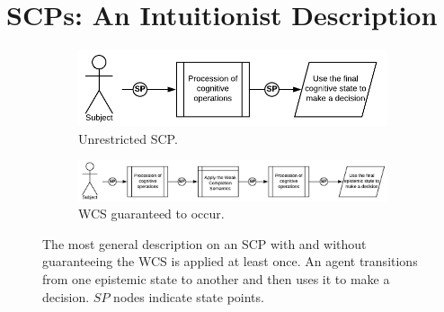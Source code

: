 \documentclass[
11pt, %
english, %
singlespacing, %
headsepline, %
]{MastersDoctoralThesis} %
\begin{document}
\section{SCPs: An Intuitionist Description} \label{ssec:intu}
\begin{figure}
\begin{subfigure}{.35\textwidth}
  \centering
  \includegraphics[width=0.97\linewidth]{general}
  \caption{Unrestricted SCP.}
  \label{fig:scp_general}
\end{subfigure}%
\begin{subfigure}{.65\textwidth}
  \centering
  \includegraphics[width=0.97\linewidth]{generalWCS}
  \caption{WCS guaranteed to occur.}
  \label{fig:sfig2}
\end{subfigure}
\caption{The most general description on an SCP with and without guaranteeing the WCS is applied at least once. An agent transitions from one epistemic state to another and then uses it to make a decision. $SP$ nodes indicate state points.}
\label{fig:scp_generalWCS}
\end{figure}
\end{document}
